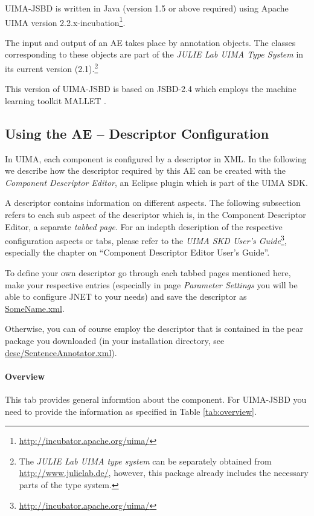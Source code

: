 \documentclass[11pt,a4paper,halfparskip]{scrartcl}
\begin{document}
UIMA-JSBD is written in Java (version 1.5 or above required) using
Apache UIMA version
2.2.x-incubation\footnote{\url{http://incubator.apache.org/uima/}}.

The input and output of an AE takes place by annotation objects. The
classes corresponding to these objects are part of the \emph{JULIE Lab
  UIMA Type System} in its current version (2.1).\footnote{The
  \emph{JULIE Lab UIMA type system} can be separately obtained from
  \url{http://www.julielab.de/}, however, this package already
  includes the necessary parts of the type system.}

This version of UIMA-JSBD is based on JSBD-2.4 which employs the
machine learning toolkit MALLET \cite{McCallum2002}.




\subsection{Using the AE -- Descriptor Configuration}

In UIMA, each component is configured by a descriptor in XML. In the
following we describe how the descriptor required by this AE can be
created with the \emph{Component Descriptor Editor}, an Eclipse plugin
which is part of the UIMA SDK.

A descriptor contains information on different aspects. The following
subsection refers to each sub aspect of the descriptor which is, in
the Component Descriptor Editor, a separate \emph{tabbed page}. For an
indepth description of the respective configuration aspects or tabs,
please refer to the \emph{UIMA SKD User's
  Guide}\footnote{\url{http://incubator.apache.org/uima/}}, especially
the chapter on ``Component Descriptor Editor User's Guide''.

To define your own descriptor go through each tabbed pages mentioned
here, make your respective entries (especially in page \emph{Parameter
  Settings} you will be able to configure JNET to your needs) and save
the descriptor as \url{SomeName.xml}.

Otherwise, you can of course employ the descriptor that is contained
in the pear package you downloaded (in your installation directory, see
\url{desc/SentenceAnnotator.xml}).

\paragraph{Overview}
This tab provides general informtion about the component. For 
UIMA-JSBD you need to provide the information as specified in Table
\ref{tab:overview}.
\end{document}
